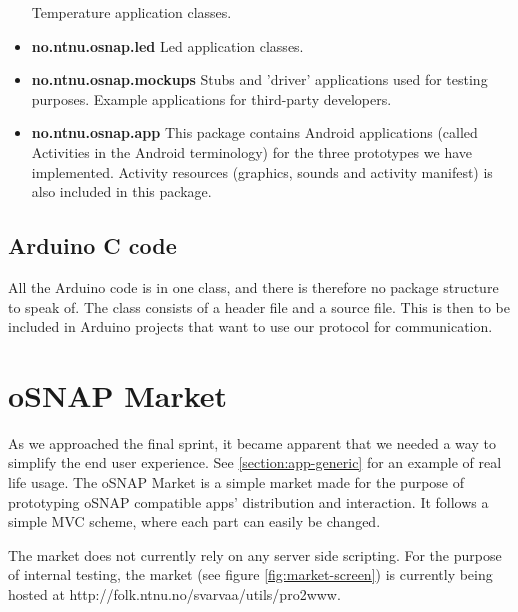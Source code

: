\begin{itemize}
		Temperature application classes.
	\item \textbf{no.ntnu.osnap.led}\newline
		Led application classes.
	\item \textbf{no.ntnu.osnap.mockups}  \newline \label{section:mockup}
		Stubs and 'driver' applications used for testing purposes.
		Example applications for third-party developers.
	\item \textbf{no.ntnu.osnap.app} \newline
		This package contains Android applications (called Activities in the Android terminology) for the three prototypes
		we have implemented. Activity resources (graphics, sounds and activity manifest) is also included in this package.
\end{itemize}

\subsection{Arduino C code}
All the Arduino code is in one class, and there is therefore no package structure to speak of.
The class consists of a header file and a source file. This is then to be included in Arduino projects
that want to use our protocol for communication.

\section{oSNAP Market}
As we approached the final sprint, it became apparent that we needed a way to simplify the end user experience. See \ref{section:app-generic} for an example of real life usage. The oSNAP Market is a simple market made for the purpose of prototyping oSNAP compatible apps' distribution and interaction. It follows a simple MVC scheme, where each part can easily be changed.

The market does not currently rely on any server side scripting. For the purpose of internal testing, the market (see figure \ref{fig:market-screen}) is currently being hosted at \newline http://folk.ntnu.no/svarvaa/utils/pro2www.

